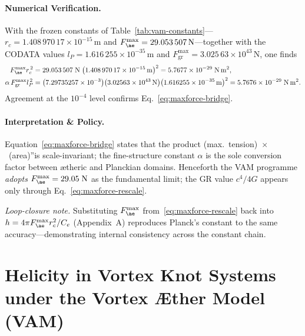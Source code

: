     \paragraph{Numerical Verification.}
    With the frozen constants of Table~\ref{tab:vam-constants}— \(r_{c}=1.408\,970\,17\times10^{-15}\,\mathrm{m}\) and \(F_{\ae}^{\max}=29.053\,507\,\mathrm{N}\)—together with the CODATA values \(l_{P}=1.616\,255\times10^{-35}\,\mathrm{m}\) and \(F_{\mathrm{gr}}^{\max}=3.025\,63\times10^{43}\,\mathrm{N}\), one finds
    \begin{align}
        F_{\ae}^{\max} r_{c}^{\,2} &=
        29.053\,507\;\mathrm{N}\;
        \bigl(1.408\,970\,17\times10^{-15}\,\mathrm{m}\bigr)^{2}
        =5.7677\times10^{-29}\;\mathrm{N\,m^{2}},\\
        \alpha\,F_{\mathrm{gr}}^{\max} l_{P}^{\,2} &=
        \bigl(7.29735257\times10^{-3}\bigr)
        \bigl(3.02563\times10^{43}\,\mathrm{N}\bigr)
        \bigl(1.616255\times10^{-35}\,\mathrm{m}\bigr)^{2}
        =5.7676\times10^{-29}\;\mathrm{N\,m^{2}}.
    \end{align}
    Agreement at the \(10^{-4}\) level confirms Eq.~\eqref{eq:maxforce-bridge}.

    \paragraph{Interpretation \& Policy.} Equation~\eqref{eq:maxforce-bridge} states that the product \grqq(max.~tension)~$\times$~(area)\textquotedblright is scale-invariant; the fine-structure constant \(\alpha\) is the sole conversion factor between ætheric and Planckian domains.  Henceforth the VAM programme \emph{adopts} \(F_{\ae}^{\max}=29.05\;\mathrm{N}\) as the fundamental limit; the GR value \(c^{4}/4G\) appears only through Eq.~\eqref{eq:maxforce-rescale}.

    \smallskip
    \noindent\emph{Loop-closure note.}  Substituting \(F_{\ae}^{\max}\) from~\eqref{eq:maxforce-rescale} back into \(h=4\pi F_{\ae}^{\max}r_{c}^{2}/C_{e}\) (Appendix~A) reproduces    Planck's constant to the same accuracy—demonstrating internal consistency across the constant chain.


\section{Helicity in Vortex Knot Systems under the Vortex Æther Model (VAM)}\label{sec:calculate-knot-helicity}

